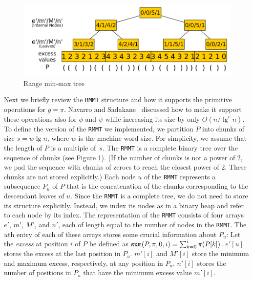 \begin{figure}[t]
  \centerline{\includegraphics[scale=0.28]{./images/Range-min-max-tree.png}}
  \vspace{1ex}
  \caption{Range min-max tree}
  \label{fig:RangeMinMaxTree}
\end{figure}

Next we briefly review the {\tt RMMT} structure and how it supports
the primitive operations for $g = \pi$.  Navarro and
Sadakane~\cite{Navarro:2014:FFS:2620785.2601073} discussed how to make
it support these operations also for $\phi$ and $\psi$ while
increasing its size by only $O(n/\lg^c n)$.  To define the version of
the {\tt RMMT} we implemented, we partition $P$ into chunks
of size $s = w \lg n$, where $w$ is the machine word size.  For
simplicity, we assume that the length of $P$ is a multiple of~$s$.
The {\tt RMMT} is a complete binary tree over the sequence of
chunks (see Figure \ref{fig:RangeMinMaxTree}).
(If the number of chunks is not a power of $2$, we pad the sequence
with chunks of zeroes to reach the closest power of $2$.
These chunks are not stored explicitly.)
Each node $u$ of the {\tt RMMT} represents a subsequence $P_u$
of $P$ that is the concatenation of the chunks corresponding to the
descendant leaves of $u$.  Since the {\tt RMMT} is a complete tree, we
do not need to store its structure explicitly.  Instead, we index its
nodes as in a binary heap and refer to each node by its index.  The
representation of the {\tt RMMT} consists of four arrays $e'$, $m'$,
$M'$, and $n'$, each of length equal to the number of nodes in the
{\tt RMMT}.  The $u$th entry of each of these arrays stores some
crucial information about $P_u$: Let the {\em excess} at position $i$
of $P$ be defined as $\mathtt{sum}(P,\pi,0,i) = \sum_{k=0}^{i} \pi(P[k])$.
$e'[u]$ stores the excess at the last position in $P_u$.  $m'[i]$ and
$M'[i]$ store the minimum and maximum excess, respectively, at any position in
$P_u$.  $n'[i]$ stores the number of positions in $P_u$ that
have the minimum excess value $m'[i]$.

